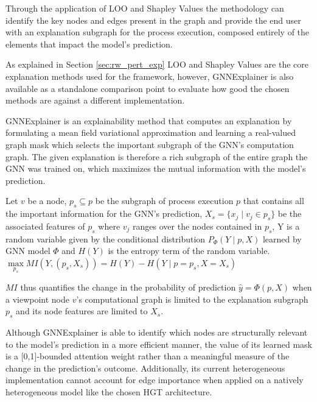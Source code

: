             Through the application of LOO and Shapley Values the methodology can identify the key nodes and edges present in the graph and provide the end user with an explanation subgraph for the process execution, composed entirely of the elements that impact the model's prediction.


            As explained in Section \ref{sec:rw_pert_exp} LOO and Shapley Values are the core explanation methods used for the framework, however, GNNExplainer is also available as a standalone comparison point to evaluate how good the chosen methods are against a different implementation.

            GNNExplainer is an explainability method that computes an explanation by formulating a mean field variational approximation and learning a real-valued graph mask which selects the important subgraph of the GNN’s computation graph. The given explanation is therefore a rich subgraph of the entire graph the GNN was trained on, which maximizes the mutual information with the model's prediction.

            \begin{definition}
            \label{def:GNNExplainer}
                Let $v$ be a node, $p_s \subseteq p$ be the subgraph of process execution $p$ that contains all the important information for the GNN's prediction, $X_s=\{x_j\mid v_j \in p_s \}$ be the associated features of $p_s$ where $v_j$ ranges over the nodes contained in $p_s$, Y is a random variable given by the conditional distribution $P_\Phi(Y\mid p,X)$ learned by GNN model $\Phi$ and $H(Y)$ is the entropy term of the random variable.
                $\max\limits_{p_s}MI(Y,(p_s,X_s))=H(Y)-H(Y\mid p=p_s, X=X_s)$
            \end{definition}
            
            $MI$ thus quantifies the change in the probability of prediction $\hat{y}=\Phi(p,X)$ when a viewpoint node $v$'s computational graph is limited to the explanation subgraph $p_s$ and its node features are limited to $X_s$.

            Although GNNExplainer is able to identify which nodes are structurally relevant to the model's prediction in a more efficient manner, the value of its learned mask is a [0,1]-bounded attention weight rather than a meaningful measure of the change in the prediction's outcome. Additionally, its current heterogeneous implementation cannot account for edge importance when applied on a natively heterogeneous model like the chosen HGT architecture. 

